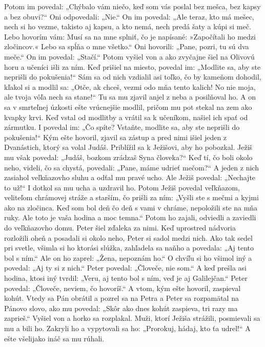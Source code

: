 \versseparator
Potom im povedal: „Chýbalo vám niečo, keď som vás poslal bez mešca, bez kapsy a bez obuvi?“ Oni odpovedali: „Nie.“ On im povedal: „Ale teraz, kto má mešec, nech si ho vezme, takisto aj kapsu, a kto nemá, nech predá šaty a kúpi si meč. 
Lebo hovorím vám: Musí sa na mne splniť, čo je napísané: »Započítali ho medzi zločincov.« Lebo sa spĺňa o mne všetko.“ 
Oni hovorili: „Pane, pozri, tu sú dva meče.“ On im povedal: „Stačí.“
\versseparator
Potom vyšiel von a ako zvyčajne šiel na Olivovú horu a učeníci išli za ním. Keď prišiel na miesto, povedal im: „Modlite sa, aby ste neprišli do pokušenia!“ Sám sa od nich vzdialil asi toľko, čo by kameňom dohodil, kľakol si a modlil sa: „Otče, ak chceš, vezmi odo mňa tento kalich! No nie moja, ale tvoja vôľa nech sa stane!“ Tu sa mu zjavil anjel z neba a posilňoval ho. A on sa v smrteľnej úzkosti ešte vrúcnejšie modlil, pričom mu pot stekal na zem ako kvapky krvi. Keď vstal od modlitby a vrátil sa k učeníkom, našiel ich spať od zármutku. I povedal im: „Čo spíte? Vstaňte, modlite sa, aby ste neprišli do pokušenia!“
\versseparator
Kým ešte hovoril, zjavil sa zástup a pred nimi išiel jeden z Dvanástich, ktorý sa volal Judáš. Priblížil sa k Ježišovi, aby ho pobozkal. Ježiš mu však povedal: „Judáš, bozkom zrádzaš Syna človeka?“ Keď tí, čo boli okolo neho, videli, čo sa chystá, povedali: „Pane, máme udrieť mečom?“ A jeden z nich zasiahol veľkňazovho sluhu a odťal mu pravé ucho. Ale Ježiš povedal: „Nechajte to už!“ I dotkol sa mu ucha a uzdravil ho. Potom Ježiš povedal veľkňazom, veliteľom chrámovej stráže a starším, čo prišli za ním: „Vyšli ste s mečmi a kyjmi ako na zločinca. Keď som bol deň čo deň s vami v chráme, nepoložili ste na mňa ruky. Ale toto je vaša hodina a moc temna.“
\versseparator
Potom ho zajali, odviedli a zaviedli do veľkňazovho domu. Peter šiel zďaleka za nimi. Keď uprostred nádvoria rozložili oheň a posadali si okolo neho, Peter si sadol medzi nich. Ako tak sedel pri svetle, všimla si ho ktorási slúžka, zahľadela sa naňho a povedala: „Aj tento bol s ním.“ Ale on ho zaprel: „Žena, nepoznám ho.“ O chvíľu si ho všimol iný a povedal: „Aj ty si z nich.“ Peter povedal: „Človeče, nie som.“ A keď prešla asi hodina, ktosi iný tvrdil: „Veru, aj tento bol s ním, veď je aj Galilejčan.“ Peter povedal: „Človeče, neviem, čo hovoríš.“ A vtom, kým ešte hovoril, zaspieval kohút. 
Vtedy sa Pán obrátil a pozrel sa na Petra a Peter sa rozpamätal na Pánovo slovo, ako mu povedal: „Skôr ako dnes kohút zaspieva, tri razy ma zaprieš.“ Vyšiel von a horko sa rozplakal.
\versseparator
Muži, ktorí Ježiša strážili, posmievali sa mu a bili ho. Zakryli ho a vypytovali sa ho: „Prorokuj, hádaj, kto ťa udrel!“ A ešte všelijako ináč sa mu rúhali.

